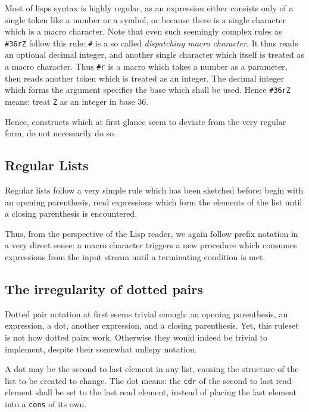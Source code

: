 \documentclass[a4paper,10pt,twoside]{report}
\newcommand{\sym}[1]{\texttt{#1}}
\begin{document}
Most of lisps syntax is highly regular, as an expression either consists only of
a single token like a number or a symbol, or because there is a single character
which is a macro character.  Note that even such seemingly complex rules as
\texttt{\#36rZ} follow this rule: \texttt{\#} is a so called \emph{dispatching
  macro character}.  It thus reads an optional decimal integer, and another
single character which itself is treated as a macro character.  Thus
\texttt{\#r} is a macro which takes a number as a parameter, then reads another
token which is treated as an integer.  The decimal integer which forms the
argument specifies the base which shall be used.  Hence \texttt{\#36rZ} means:
treat \texttt{Z} as an integer in base 36.

Hence, constructs which at first glance seem to deviate from the very regular
form, do not necessarily do so.

\subsection{Regular Lists}
\label{subsec:regular-lists}

Regular lists follow a very simple rule which has been sketched before: begin
with an opening parenthesis, read expressions which form the elements of the
list until a closing parenthesis is encountered.

Thus, from the perspective of the Lisp reader, we again follow prefix notation
in a very direct sense: a macro character triggers a new procedure which
consumes expressions from the input stream until a terminating condition is met.

\subsection{The irregularity of dotted pairs}
\label{subsec:irregular-dotted-pair}

Dotted pair notation at first seems trivial enough: an opening parenthesis, an
expression, a dot, another expression, and a closing parenthesis.  Yet, this
ruleset is not how dotted pairs work.  Otherwise they would indeed be trivial to
implement, despite their somewhat unlispy notation.

A dot may be the second to last element in any list, causing the structure of
the list to be created to change.  The dot means: the \sym{cdr} of the second to
last read element shall be set to the last read element, instead of placing the
last element into a \sym{cons} of its own.
\end{document}
